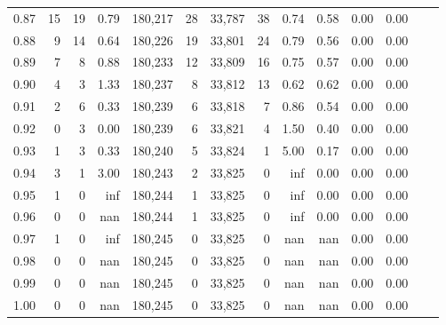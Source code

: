 \begin{tabular}{rrrrrrrrrrrrrr}
0.87 &     15 &   19 &    0.79 &  180,217 &       28 &  33,787 &      38 &  0.74 &  0.58 &  0.00 &      0.00 \\
0.88 &      9 &   14 &    0.64 &  180,226 &       19 &  33,801 &      24 &  0.79 &  0.56 &  0.00 &      0.00 \\
0.89 &      7 &    8 &    0.88 &  180,233 &       12 &  33,809 &      16 &  0.75 &  0.57 &  0.00 &      0.00 \\
0.90 &      4 &    3 &    1.33 &  180,237 &        8 &  33,812 &      13 &  0.62 &  0.62 &  0.00 &      0.00 \\
0.91 &      2 &    6 &    0.33 &  180,239 &        6 &  33,818 &       7 &  0.86 &  0.54 &  0.00 &      0.00 \\
0.92 &      0 &    3 &    0.00 &  180,239 &        6 &  33,821 &       4 &  1.50 &  0.40 &  0.00 &      0.00 \\
0.93 &      1 &    3 &    0.33 &  180,240 &        5 &  33,824 &       1 &  5.00 &  0.17 &  0.00 &      0.00 \\
0.94 &      3 &    1 &    3.00 &  180,243 &        2 &  33,825 &       0 &   inf &  0.00 &  0.00 &      0.00 \\
0.95 &      1 &    0 &     inf &  180,244 &        1 &  33,825 &       0 &   inf &  0.00 &  0.00 &      0.00 \\
0.96 &      0 &    0 &     nan &  180,244 &        1 &  33,825 &       0 &   inf &  0.00 &  0.00 &      0.00 \\
0.97 &      1 &    0 &     inf &  180,245 &        0 &  33,825 &       0 &   nan &   nan &  0.00 &      0.00 \\
0.98 &      0 &    0 &     nan &  180,245 &        0 &  33,825 &       0 &   nan &   nan &  0.00 &      0.00 \\
0.99 &      0 &    0 &     nan &  180,245 &        0 &  33,825 &       0 &   nan &   nan &  0.00 &      0.00 \\
1.00 &      0 &    0 &     nan &  180,245 &        0 &  33,825 &       0 &   nan &   nan &  0.00 &      0.00 \\
\bottomrule
\end{tabular}
